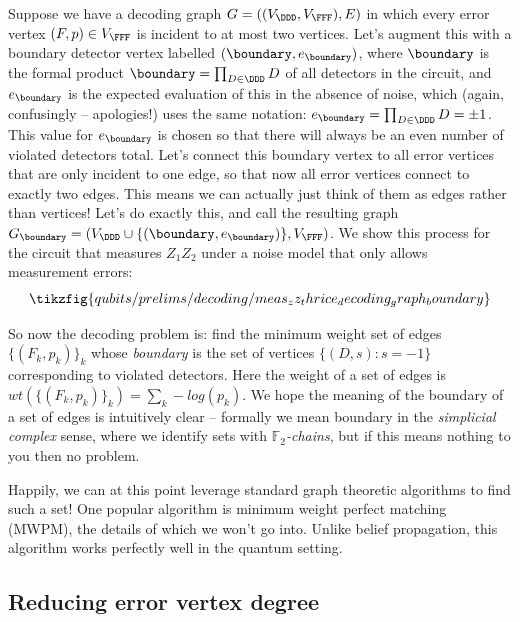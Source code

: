 Suppose we have a decoding graph $G = ((V_\DDD, V_\FFF), E)$ in which every error vertex $(F, p) \in V_\FFF$ is incident to at most two vertices.
Let's augment this with a boundary detector vertex labelled $(\boundary, e_{\boundary})$, where $\boundary$ is the formal product $\boundary = \prod_{D \in \DDD} D$ of all detectors in the circuit, and $e_{\boundary}$ is the expected evaluation of this in the absence of noise, which (again, confusingly -- apologies!) uses the same notation: $e_{\boundary} = \prod_{D \in \DDD} D = \pm 1$.
This value for $e_{\boundary}$ is chosen so that there will always be an even number of violated detectors total.
Let's connect this boundary vertex to all error vertices that are only incident to one edge, so that now all error vertices connect to exactly two edges.
This means we can actually just think of them as edges rather than vertices!
Let's do exactly this, and call the resulting graph $G_\boundary = (V_\DDD \cup \{(\boundary, e_\boundary)\}, V_\FFF)$.
We show this process for the circuit that measures $Z_1 Z_2$ under a noise model that only allows measurement errors:
\begin{equation}
    \tikzfig{qubits/prelims/decoding/meas_zz_thrice_decoding_graph_boundary}
\end{equation}

So now the decoding problem is: find the minimum weight set of edges $\{(F_k, p_k)\}_k$ whose \textit{boundary} is the set of vertices $\{(D, s) : s = -1\}$ corresponding to violated detectors.
Here the weight of a set of edges is $wt(\{(F_k, p_k)\}_k) = \sum_k -log(p_k)$.
We hope the meaning of the boundary of a set of edges is intuitively clear -- formally we mean boundary in the \textit{simplicial complex} sense, where we identify sets with \textit{$\mathbb{F}_2$-chains}, but if this means nothing to you then no problem.

Happily, we can at this point leverage standard graph theoretic algorithms to find such a set!
One popular algorithm is minimum weight perfect matching (MWPM), the details of which we won't go into.
Unlike belief propagation, this algorithm works perfectly well in the quantum setting.

\subsection{Reducing error vertex degree}

